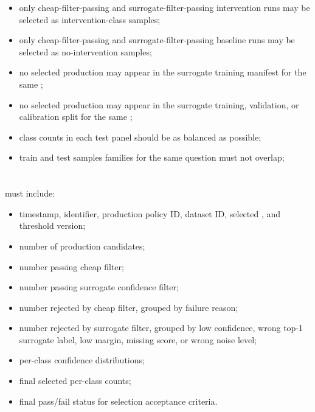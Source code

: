 \documentclass[11pt]{article}
\begin{document}
\begin{itemize}
\item only cheap-filter-passing and surrogate-filter-passing intervention runs may be selected as intervention-class samples;
\item only cheap-filter-passing and surrogate-filter-passing baseline runs may be selected as no-intervention samples;
\item no selected production  may appear in the surrogate training manifest for the same ;
\item no selected production  may appear in the surrogate training, validation, or calibration split for the same ;
\item class counts in each test panel should be as balanced as possible;
\item train and test samples families for the same question must not overlap;
\end{itemize}

\section*{\texorpdfstring{}{selection\_report.json}}

 must include:

\begin{itemize}
\item timestamp, \termSimulator identifier, production policy ID, dataset ID, selected , and threshold version;
\item number of production candidates;
\item number passing cheap filter;
\item number passing surrogate confidence filter;
\item number rejected by cheap filter, grouped by failure reason;
\item number rejected by surrogate filter, grouped by low confidence, wrong top-1 surrogate label, low margin, missing score, or wrong noise level;
\item per-class confidence distributions;
\item final selected per-class counts;
\item final pass/fail status for selection acceptance criteria.
\end{itemize}
\end{document}
